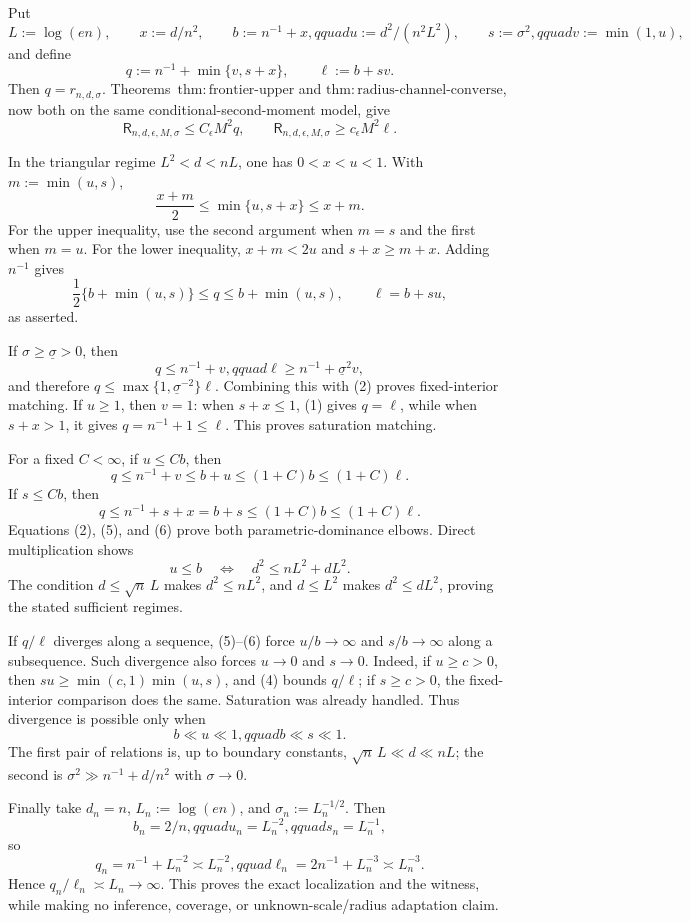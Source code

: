 Put
\[
 L:=\log(en),\qquad x:=d/n^2,\qquad b:=n^{-1}+x,qquad
 u:=d^2/(n^2L^2),\qquad s:=\sigma^2,qquad v:=\min(1,u),
\]
and define
\[
 q:=n^{-1}+\min\{v,s+x\},\qquad \ell:=b+sv.
\tag{1}
\]
Then \(q=r_{n,d,\sigma}\).  Theorems~\(\mathrm{thm:frontier\text{-}upper}\) and \(\mathrm{thm:radius\text{-}channel\text{-}converse}\), now both on the same conditional-second-moment model, give
\[
 \mathsf R_{n,d,\epsilon,M,\sigma}\le C_\epsilon M^2q,
 \qquad
 \mathsf R_{n,d,\epsilon,M,\sigma}\ge c_\epsilon M^2\ell.
\tag{2}
\]

In the triangular regime \(L^2<d<nL\), one has \(0<x<u<1\).  With \(m:=\min(u,s)\),
\[
 \frac{x+m}{2}\le\min\{u,s+x\}\le x+m.
\tag{3}
\]
For the upper inequality, use the second argument when \(m=s\) and the first when \(m=u\).  For the lower inequality, \(x+m<2u\) and \(s+x\ge m+x\).  Adding \(n^{-1}\) gives
\[
 \frac12\{b+\min(u,s)\}\le q\le b+\min(u,s),
 \qquad \ell=b+su,
\tag{4}
\]
as asserted.

If \(\sigma\ge\underline\sigma>0\), then
\[
 q\le n^{-1}+v,qquad \ell\ge n^{-1}+\underline\sigma^2v,
\]
and therefore \(q\le\max\{1,\underline\sigma^{-2}\}\ell\).  Combining this with (2) proves fixed-interior matching.  If \(u\ge1\), then \(v=1\): when \(s+x\le1\), (1) gives \(q=\ell\), while when \(s+x>1\), it gives \(q=n^{-1}+1\le\ell\).  This proves saturation matching.

For a fixed \(C<\infty\), if \(u\le Cb\), then
\[
 q\le n^{-1}+v\le b+u\le(1+C)b\le(1+C)\ell.
\tag{5}
\]
If \(s\le Cb\), then
\[
 q\le n^{-1}+s+x=b+s\le(1+C)b\le(1+C)\ell.
\tag{6}
\]
Equations (2), (5), and (6) prove both parametric-dominance elbows.  Direct multiplication shows
\[
 u\le b\quad\Longleftrightarrow\quad d^2\le nL^2+dL^2.
\tag{7}
\]
The condition \(d\le\sqrt n\,L\) makes \(d^2\le nL^2\), and \(d\le L^2\) makes \(d^2\le dL^2\), proving the stated sufficient regimes.

If \(q/\ell\) diverges along a sequence, (5)--(6) force \(u/b\to\infty\) and \(s/b\to\infty\) along a subsequence.  Such divergence also forces \(u\to0\) and \(s\to0\).  Indeed, if \(u\ge c>0\), then \(su\ge\min(c,1)\min(u,s)\), and (4) bounds \(q/\ell\); if \(s\ge c>0\), the fixed-interior comparison does the same.  Saturation was already handled.  Thus divergence is possible only when
\[
 b\ll u\ll1,qquad b\ll s\ll1.
\tag{8}
\]
The first pair of relations is, up to boundary constants, \(\sqrt n\,L\ll d\ll nL\); the second is \(\sigma^2\gg n^{-1}+d/n^2\) with \(\sigma\to0\).

Finally take \(d_n=n\), \(L_n:=\log(en)\), and \(\sigma_n:=L_n^{-1/2}\).  Then
\[
 b_n=2/n,qquad u_n=L_n^{-2},qquad s_n=L_n^{-1},
\]
so
\[
 q_n=n^{-1}+L_n^{-2}\asymp L_n^{-2},qquad
 \ell_n=2n^{-1}+L_n^{-3}\asymp L_n^{-3}.
\]
Hence \(q_n/\ell_n\asymp L_n\to\infty\).  This proves the exact localization and the witness, while making no inference, coverage, or unknown-scale/radius adaptation claim.